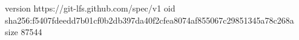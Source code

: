 version https://git-lfs.github.com/spec/v1
oid sha256:f5407fdeedd7b01cf0b2db397da40f2cfea8074af855067c29851345a78c268a
size 87544
